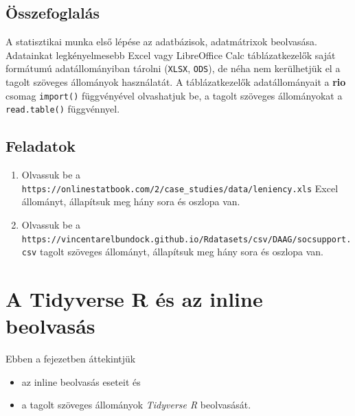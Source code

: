\documentclass[
]{book}
\makeatletter
\providecommand{\tightlist}{%
  \setlength{\itemsep}{0pt}\setlength{\parskip}{0pt}}
\newenvironment{kframe}{%
\medskip{}
\setlength{\fboxsep}{.8em}
 \def\at@end@of@kframe{}%
 \ifinner\ifhmode%
  \def\at@end@of@kframe{\end{minipage}}%
  \begin{minipage}{\columnwidth}%
 \fi\fi%
 \def\FrameCommand##1{\hskip\@totalleftmargin \hskip-\fboxsep
 \colorbox{shadecolor}{##1}\hskip-\fboxsep
     \hskip-\linewidth \hskip-\@totalleftmargin \hskip\columnwidth}%
 \MakeFramed {\advance\hsize-\width
   \@totalleftmargin\z@ \linewidth\hsize
   \@setminipage}}%
 {\par\unskip\endMakeFramed%
 \at@end@of@kframe}
\newenvironment{rmdblock}[1]
  {
  \begin{itemize}
  \renewcommand{\labelitemi}{
    \raisebox{-.7\height}[0pt][0pt]{
      {\setkeys{Gin}{width=3em,keepaspectratio}\texttt{[image: images/\#1]}}
    }
  }
  \setlength{\fboxsep}{1em}
  \begin{kframe}
  \item
  }
  {
  \end{kframe}
  \end{itemize}
  }
\newenvironment{rmdlevel2}
  {\begin{rmdblock}{level2}}
  {\end{rmdblock}}
\newenvironment{rmdsummary}
  {\begin{rmdblock}{summary}}
  {\end{rmdblock}}
\newenvironment{rmdexercise}
  {\begin{rmdblock}{exercise}}
  {\end{rmdblock}}
\makeatother
\begin{document}
\hypertarget{beolvasas-1-summary}{%
\subsection{Összefoglalás}\label{beolvasas-1-summary}}

\begin{rmdsummary}
A statisztikai munka első lépése az adatbázisok, adatmátrixok
beolvasása. Adatainkat legkényelmesebb Excel vagy LibreOffice Calc
táblázatkezelők saját formátumú adatállományiban tárolni (\texttt{XLSX},
\texttt{ODS}), de néha nem kerülhetjük el a tagolt szöveges állományok
használatát. A táblázatkezelők adatállományait a \textbf{rio} csomag
\texttt{import()} függvényével olvashatjuk be, a tagolt szöveges
állományokat a \texttt{read.table()} függvénnyel.
\end{rmdsummary}

\hypertarget{beolvasas-1-exercise}{%
\subsection{Feladatok}\label{beolvasas-1-exercise}}

\begin{rmdexercise}
\begin{enumerate}
\def\labelenumi{\arabic{enumi}.}
\tightlist
\item
  Olvassuk be a \texttt{https://onlinestatbook.com/2/case\_studies/data/leniency.xls} Excel állományt, állapítsuk meg hány sora és oszlopa van.
\item
  Olvassuk be a \texttt{https://vincentarelbundock.github.io/Rdatasets/csv/DAAG/socsupport.csv} tagolt szöveges állományt, állapítsuk meg hány sora és oszlopa van.
\end{enumerate}
\end{rmdexercise}

\hypertarget{a-tidyverse-r-uxe9s-az-inline-beolvasuxe1s}{%
\section{A Tidyverse R és az inline beolvasás}\label{a-tidyverse-r-uxe9s-az-inline-beolvasuxe1s}}

\begin{rmdlevel2}
Ebben a fejezetben áttekintjük

\begin{itemize}
\tightlist
\item
  az inline beolvasás eseteit és
\item
  a tagolt szöveges állományok \emph{Tidyverse R} beolvasását.
\end{itemize}
\end{rmdlevel2}
\end{document}
